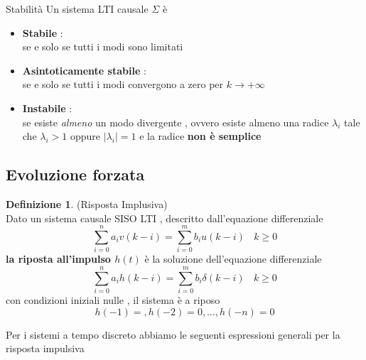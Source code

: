 \documentclass{article}
\theoremstyle{definition}
\newtheorem*{definizione}{Definizione}
\newcommand{\la}{\lambda}
\newcommand{\sisdiscro}{\sum_{i=0}^n a_iv(k-i)=\sum_{i=0}^m b_iu(k-i) \ \ \ \ k \geq 0}
\newcommand{\sisdiscrdo}{\sum_{i=0}^n a_ih(k-i)=\sum_{i=0}^m b_i\delta(k-i) \ \ \ \ k \geq 0}
\begin{document}
	\begin{teo}{Stabilità}
		Un sistema LTI causale $\Sigma$ è 
		\begin{itemize}
			\item \textbf{Stabile} : \\ se e solo se tutti i modi sono limitati 
			\item \textbf{Asintoticamente stabile }: \\se e solo se tutti i modi convergono a zero per $k \rightarrow + \infty $
			\item \textbf{Instabile} :\\ se esiste \textit{almeno} un modo divergente , ovvero esiste almeno una radice $\la_i $ tale che $\la_i >1 $ oppure $|\la_i|=1$ e la radice \textbf{non è semplice }
		\end{itemize} 
	\end{teo}
	\newpage
		\subsection{Evoluzione forzata}
		\begin{definizione}(Risposta Implusiva)\\
		Dato un sistema causale SISO LTI , descritto dall'equazione differenziale 
		$$\sisdiscro$$
		 \textbf{la riposta all'impulso $h(t)$} è la soluzione dell'equazione differenziale   
		$$\sisdiscrdo$$
		con condizioni iniziali nulle , il sistema è a riposo 
		$$h(-1)= , h(-2)=0 , \dots , h(-n)=0
		$$ 
	\end{definizione}
Per i sistemi a tempo discreto abbiamo le seguenti espressioni generali per la risposta impulsiva
\end{document}
